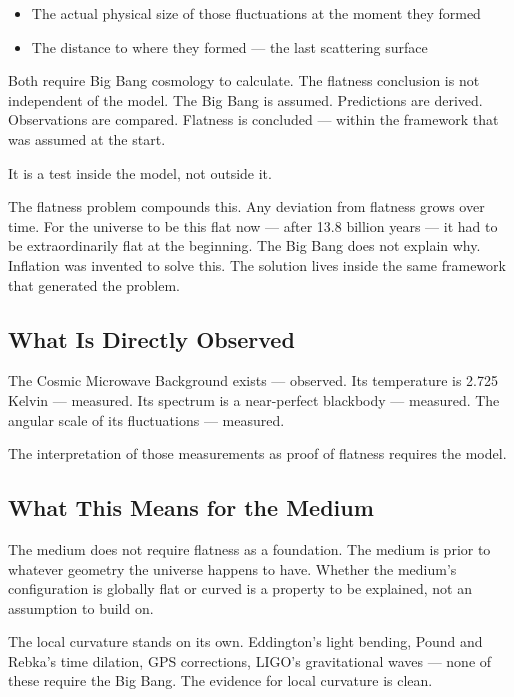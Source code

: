 \documentclass[11pt]{article}
\begin{document}
\begin{itemize}
\item The actual physical size of those fluctuations at the moment they formed
\item The distance to where they formed — the last scattering surface
\end{itemize}

Both require Big Bang cosmology to calculate. The flatness conclusion is not
independent of the model. The Big Bang is assumed. Predictions are derived.
Observations are compared. Flatness is concluded — within the framework that was
assumed at the start.

It is a test inside the model, not outside it.

The flatness problem compounds this. Any deviation from flatness grows over time.
For the universe to be this flat now — after 13.8 billion years — it had to be
extraordinarily flat at the beginning. The Big Bang does not explain why.
Inflation was invented to solve this. The solution lives inside the same
framework that generated the problem.

\subsection{What Is Directly Observed}
\label{sec:org3d5a262}

The Cosmic Microwave Background exists — observed. Its temperature is 2.725
Kelvin — measured. Its spectrum is a near-perfect blackbody — measured. The
angular scale of its fluctuations — measured.

The interpretation of those measurements as proof of flatness requires the model.

\subsection{What This Means for the Medium}
\label{sec:org204505a}

The medium does not require flatness as a foundation. The medium is prior to
whatever geometry the universe happens to have. Whether the medium's
configuration is globally flat or curved is a property to be explained, not an
assumption to build on.

The local curvature stands on its own. Eddington's light bending, Pound and
Rebka's time dilation, GPS corrections, LIGO's gravitational waves — none of
these require the Big Bang. The evidence for local curvature is clean.
\end{document}
